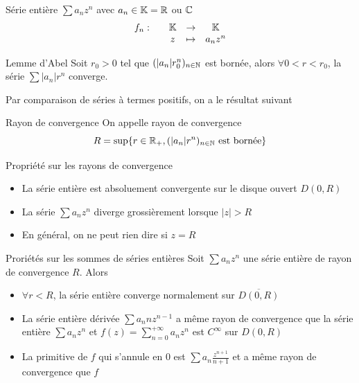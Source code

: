 \documentclass[]{report}
\begin{document}
\begin{df}{Série entière}{}
    $\sum a_n z^n$ avec $a_n\in \mathbb{K}=\mathbb{R}$ ou $\mathbb{C}$
    \[\begin{array}{ccccc} f_n : & & \mathbb{K} & \to & \mathbb{K} \\ & & z & \mapsto & a_n z^n \end{array}\]
\end{df}

\begin{lm}{Lemme d'Abel}{}
    Soit $r_0>0$ tel que $(|a_n|r_0^n)_{n\in\mathbb{N}}$ est bornée, alors $\forall 0<r<r_0$, la série $\sum|a_n|r^n$ converge.
\end{lm}

Par comparaison de séries à termes positifs, on a le résultat suivant

\begin{df}{Rayon de convergence}{}
    On appelle rayon de convergence
    \[R=\sup\{r\in \mathbb{R}_+,(|a_n|r^n)_{n\in \mathbb{N}}\text{ est bornée}\}\]
\end{df}

\begin{prop}{Propriété sur les rayons de convergence}{}
    \begin{itemize}
        \item La série entière est absoluement convergente sur le disque ouvert $D(0,R)$
        \item La série $\sum a_n z^n$ diverge grossièrement lorsque $|z|>R$
        \item En général, on ne peut rien dire si $z=R$
    \end{itemize}
\end{prop}

\begin{prop}{Proriétés sur les sommes de séries entières}{}
    Soit $\sum a_n z^n$ une série entière de rayon de convergence $R$. Alors
    \begin{itemize}
        \item $\forall r<R$, la série entière converge normalement sur $\overline{D(0,R)}$
        \item La série entière dérivée $\sum a_n n z^{n-1}$ a même rayon de convergence que la série entière $\sum a_n z^n$ et $f(z)=\sum_{n=0}^{+\infty} a_n z^n$ est $C^\infty$ sur $D(0,R)$
        \item La primitive de $f$ qui s'annule en $0$ est $\sum a_n \frac{z^{n+1}}{n+1}$ et a même rayon de convergence que $f$
    \end{itemize}
\end{prop}
\end{document}
